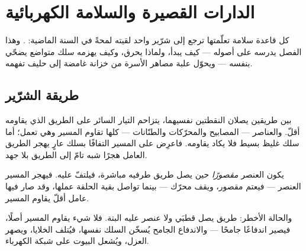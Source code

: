 \chapter{الدارات القصيرة والسلامة الكهربائية}\label{ch:g7:short-circuits-safety}

كل قاعدة سلامة تعلّمتها ترجع إلى شرّير واحد لقيته لمحةً في
السنة الماضية: . وهذا الفصل يدرسه على أصوله ---
كيف يبدأ، ولماذا يحرق، وكيف يهزمه سلك متواضع يضحّي بنفسه ---
ويحوّل علبة مصاهر الأسرة من خزانة غامضة إلى حليف تفهمه.

\section{طريقة الشرّير}

\begin{proposition}\label{prop:g7:short-circuits-safety:effortless}
بين طريقين يصلان النقطتين نفسيهما، يتزاحم التيار السائر على
الطريق الذي يقاومه أقلّ. والعناصر --- المصابيح والمحرّكات
والطنّانات --- كلها تقاوم المسير وهي تعمل؛ أما سلك غليظ بسيط
فلا يكاد يقاومه. فاعرِض على المسير التفافًا بسلك عارٍ يهجر
الطريق العامل هجرًا شبه تامّ إلى الطريق بلا جهد.
\end{proposition}

\begin{definition}\label{def:g7:short-circuits-safety:device}
يكون العنصر \emph{مقصورًا} حين يصل طريق 
طرفيه مباشرة، فيلتفّ عليه. فيهجر المسير العنصر --- فيعتم 
مقصور، ويقف محرّك --- بينما تواصل بقية الحلقة عملها، وقد صار
فيها عامل أقلّ يقاوم المسير.
\end{definition}

\begin{definition}\label{def:g7:short-circuits-safety:battery}
والحالة الأخطر: طريق  يصل قطبَي \emph{} ولا عنصر
عليه البتة. فلا شيء يقاوم المسير أصلًا، فيصير اندفاعًا جامحًا
--- والاندفاع الجامح يُسخّن السلك  نفسها، فيُتلف
الخلايا، ويصهر العزل، ويُشعل البيوت على شبكة الكهرباء.
\end{definition}

